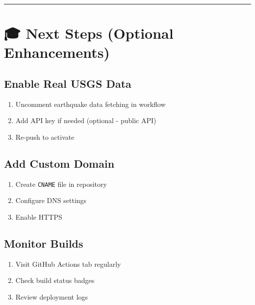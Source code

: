 \documentclass[
  11pt,
  oneside,
  openany]{scrbook}
\providecommand{\tightlist}{%
  \setlength{\itemsep}{0pt}\setlength{\parskip}{0pt}}\usepackage{longtable,booktabs,array}
\begin{document}
\begin{center}\rule{0.5\linewidth}{0.5pt}\end{center}

\chapter{🎓 Next Steps (Optional
Enhancements)}\label{next-steps-optional-enhancements}

\section{\texorpdfstring{\textbf{Enable Real USGS
Data}}{Enable Real USGS Data}}\label{enable-real-usgs-data}

\begin{enumerate}
\def\labelenumi{\arabic{enumi}.}
\tightlist
\item
  Uncomment earthquake data fetching in workflow
\item
  Add API key if needed (optional - public API)
\item
  Re-push to activate
\end{enumerate}

\section{\texorpdfstring{\textbf{Add Custom
Domain}}{Add Custom Domain}}\label{add-custom-domain}

\begin{enumerate}
\def\labelenumi{\arabic{enumi}.}
\tightlist
\item
  Create \texttt{CNAME} file in repository
\item
  Configure DNS settings
\item
  Enable HTTPS
\end{enumerate}

\section{\texorpdfstring{\textbf{Monitor
Builds}}{Monitor Builds}}\label{monitor-builds}

\begin{enumerate}
\def\labelenumi{\arabic{enumi}.}
\tightlist
\item
  Visit GitHub Actions tab regularly
\item
  Check build status badges
\item
  Review deployment logs
\end{enumerate}
\end{document}

